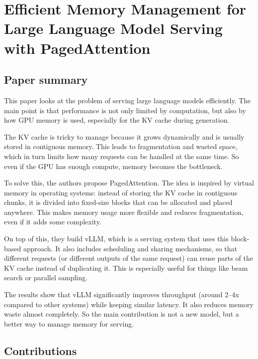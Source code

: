 \documentclass[a4paper, 12pt]{article}
\begin{document}
\section*{Efficient Memory Management for Large Language
Model Serving with PagedAttention}
\subsection{Paper summary}

This paper looks at the problem of serving large language models efficiently. The main point is that performance is not only limited by computation, but also by how GPU memory is used, especially for the KV cache during generation.

The KV cache is tricky to manage because it grows dynamically and is usually stored in contiguous memory. This leads to fragmentation and wasted space, which in turn limits how many requests can be handled at the same time. So even if the GPU has enough compute, memory becomes the bottleneck.

To solve this, the authors propose PagedAttention. The idea is inspired by virtual memory in operating systems: instead of storing the KV cache in contiguous chunks, it is divided into fixed-size blocks that can be allocated and placed anywhere. This makes memory usage more flexible and reduces fragmentation, even if it adds some complexity.

On top of this, they build vLLM, which is a serving system that uses this block-based approach. It also includes scheduling and sharing mechanisms, so that different requests (or different outputs of the same request) can reuse parts of the KV cache instead of duplicating it. This is especially useful for things like beam search or parallel sampling.

The results show that vLLM significantly improves throughput (around 2--4x compared to other systems) while keeping similar latency. It also reduces memory waste almost completely. So the main contribution is not a new model, but a better way to manage memory for serving.

\subsection{Contributions}
\end{document}
